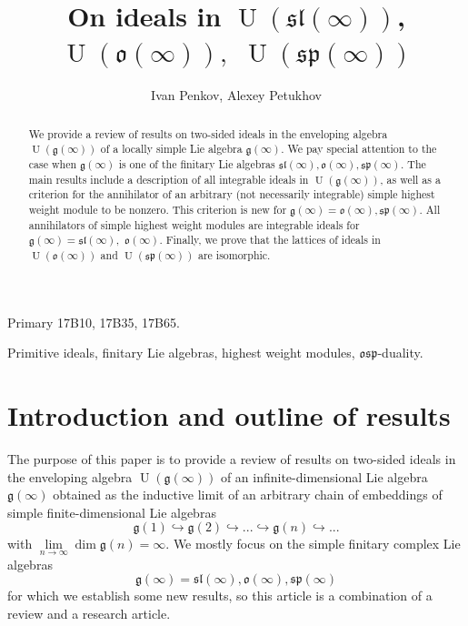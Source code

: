 \documentclass{emsprocart}
\title{On ideals in $\operatorname{U}(\mathfrak{sl}(\infty))$, $\operatorname{U}(\mathfrak o(\infty)),$ $\operatorname{U}(\mathfrak{sp}(\infty))$}
\author{Ivan Penkov, Alexey Petukhov}
\begin{document}
\begin{abstract} We provide a review of results on two-sided ideals in the enveloping algebra $\operatorname{U}(\mathfrak g(\infty))$ of a locally simple Lie algebra $\mathfrak g(\infty)$. We pay special attention to the case when $\mathfrak g(\infty)$ is one of the finitary Lie algebras $\mathfrak{sl}(\infty), \mathfrak o(\infty), \mathfrak{sp}(\infty)$. The main results include a description of all integrable ideals in $\operatorname{U}(\mathfrak g(\infty))$, as well as a criterion for the annihilator of an arbitrary (not necessarily integrable) simple highest weight module to be nonzero. This criterion is new for $\mathfrak g(\infty)=\mathfrak o(\infty), \mathfrak{sp}(\infty)$. All annihilators of simple highest weight modules are integrable ideals for $\mathfrak g(\infty)=\mathfrak{sl}(\infty),$ $\mathfrak o(\infty)$. Finally, we prove that the lattices of ideals in $\operatorname{U}(\mathfrak o(\infty))$ and $\operatorname{U}(\mathfrak{sp}(\infty))$ are isomorphic.\end{abstract}

Primary 17B10, 17B35, 17B65.

\begin{keywords}
Primitive ideals, finitary Lie algebras, highest weight modules, $\mathfrak{osp}$-duality.
\end{keywords}




\section{Introduction and outline of results}
The purpose of this paper is to provide a review of results on two-sided ideals in the enveloping algebra $\operatorname{U}(\mathfrak g(\infty))$ of an infinite-dimensional Lie algebra $\mathfrak g(\infty)$
obtained as the inductive limit of an arbitrary
chain of embeddings of simple finite-dimensional Lie
algebras\begin{equation}\mathfrak g(1)\hookrightarrow\mathfrak g(2)\hookrightarrow...\hookrightarrow\mathfrak
g(n)\hookrightarrow...\label{Ech1}\end{equation}with $\lim\limits_{n\to\infty}\dim\mathfrak
g(n)=\infty$. We mostly focus on the simple finitary complex Lie algebras $$\mathfrak g(\infty)=\mathfrak{sl}(\infty), \mathfrak o(\infty), \mathfrak{sp}(\infty)$$
for which we establish some new results, so this article is a combination of a review and a research article.%
\end{document}
